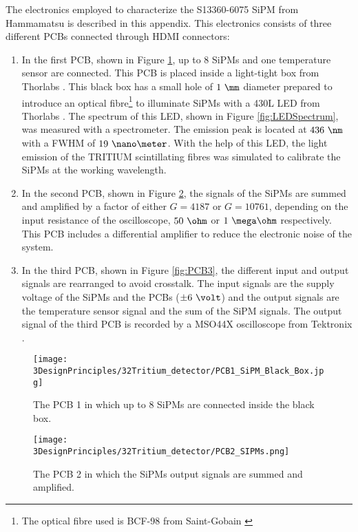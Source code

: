 The electronics employed to characterize the S13360-6075 SiPM from Hammamatsu is described in this appendix. This electronics consists of three different PCBs connected through HDMI connectors:

\begin{enumerate}
\item{} In the first PCB, shown in Figure \ref{fig:PCB1}, up to 8 SiPMs and one temperature sensor are connected. This PCB is placed inside a light-tight box from Thorlabs \cite{ThorlabsCompany}. This black box has a small hole of $1~\mm$ diameter prepared to introduce an optical fibre\footnote{The optical fibre used is BCF-98 from Saint-Gobain \cite{OpticalFibers}} to illuminate SiPMs with a 430L LED from Thorlabs \cite{LEDThorlabs}. The spectrum of this LED, shown in Figure \ref{fig:LEDSpectrum}, was measured with a spectrometer. The emission peak is located at $436~\nm$ with a FWHM of $19~\nano\meter$. With the help of this LED, the light emission of the TRITIUM scintillating fibres was simulated to calibrate the SiPMs at the working wavelength. 

\item{} In the second PCB, shown in Figure \ref{fig:PCB2}, the signals of the SiPMs are summed and amplified by a factor of either $G=4187$ or $G=10761$, depending on the input resistance of the oscilloscope, $50~\ohm$ or $1~\mega\ohm$ respectively. This PCB includes a differential amplifier to reduce the electronic noise of the system.

\item{} In the third PCB, shown in Figure \ref{fig:PCB3}, the different input and output signals are rearranged to avoid crosstalk. The input signals are the supply voltage of the SiPMs and the PCBs ($\pm 6~\volt$) and the output signals are the temperature sensor signal and the sum of the SiPM signals. The output signal of the third PCB is recorded by a MSO44X oscilloscope from Tektronix \cite{Oscilloscope}.

\end{enumerate}

\begin{figure}[h]
\centering
\texttt{[image: 3DesignPrinciples/32Tritium\_detector/PCB1\_SiPM\_Black\_Box.jpg]}
\caption{The PCB 1 in which up to 8 SiPMs are connected inside the black box.\label{fig:PCB1}}
\end{figure}

\begin{figure}[h]
\centering
\texttt{[image: 3DesignPrinciples/32Tritium\_detector/PCB2\_SIPMs.png]}
\caption{The PCB 2 in which the SiPMs output signals are summed and amplified.\label{fig:PCB2}}
\end{figure}

